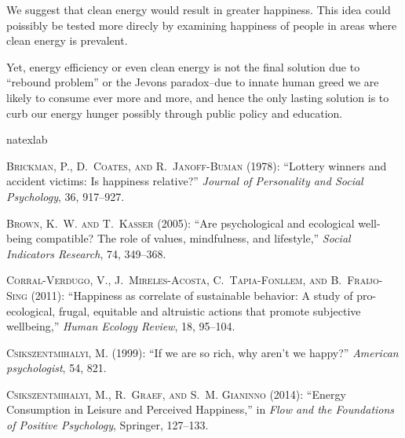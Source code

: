 \documentclass[10pt, letterpaper]{article}
\begin{document}
\begin{spacing}{1.4}
We suggest that clean energy would result in greater happiness. This idea could
poissibly be tested more direcly by examining happiness of people in areas where
clean energy is prevalent. 


Yet, energy efficiency or even clean energy is not the final solution due to
``rebound problem'' or the Jevons paradox--due to innate human greed we are
likely to consume ever more and more, and hence the only lasting solution is to
curb our energy hunger possibly through public policy and education.

\newpage
%

\begin{thebibliography}{36}
\newcommand{\enquote}[1]{``#1''}
\expandafter\ifx\csname natexlab\endcsname\relax\def\natexlab#1{#1}\fi

\textsc{Brickman, P., D.~Coates, and R.~Janoff-Buman} (1978): \enquote{Lottery
  winners and accident victims: Is happiness relative?} \emph{Journal of
  Personality and Social Psychology}, 36, 917--927.

\textsc{Brown, K.~W. and T.~Kasser} (2005): \enquote{Are psychological and
  ecological well-being compatible? The role of values, mindfulness, and
  lifestyle,} \emph{Social Indicators Research}, 74, 349--368.

\textsc{Corral-Verdugo, V., J.~Mireles-Acosta, C.~Tapia-Fonllem, and
  B.~Fraijo-Sing} (2011): \enquote{Happiness as correlate of sustainable
  behavior: A study of pro-ecological, frugal, equitable and altruistic actions
  that promote subjective wellbeing,} \emph{Human Ecology Review}, 18, 95--104.

\textsc{Csikszentmihalyi, M.} (1999): \enquote{If we are so rich, why aren't we
  happy?} \emph{American psychologist}, 54, 821.

\textsc{Csikszentmihalyi, M., R.~Graef, and S.~M. Gianinno} (2014):
  \enquote{Energy Consumption in Leisure and Perceived Happiness,} in
  \emph{Flow and the Foundations of Positive Psychology}, Springer, 127--133.


\end{thebibliography}
\end{spacing}
\end{document}
